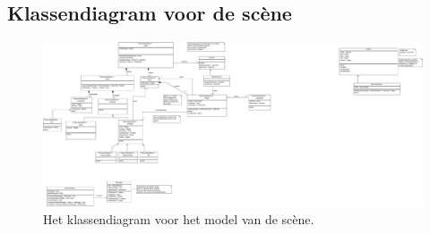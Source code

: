 \documentclass[a4paper,11pt]{article}
\begin{document}
    \subsection{Klassendiagram voor de sc\`ene}
    \begin{figure}[h]
        \centering
    	\includegraphics{../Class-diagram/SceneModel.pdf}
	\caption{Het klassendiagram voor het model van de sc\`ene.}
    \end{figure}
    \label{app:Scene}
    \FloatBarrier
    \newpage
    
\end{document}
